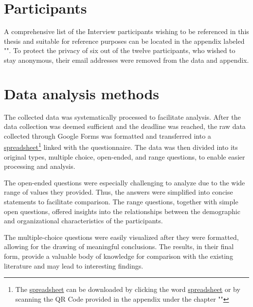 \section{Participants}\label{sec:Participants}
A comprehensive list of the Interview participants wishing to be referenced in this thesis and suitable for reference purposes can be located in the appendix labeled "". To protect the privacy of six out of the twelve participants, who wished to stay anonymous, their email addresses were removed from the data and appendix.

\section{Data analysis methods}\label{sec:Dataanalysismethods}
The collected data was systematically processed to facilitate analysis. After the data collection was deemed sufficient and the deadline was reached, the raw data collected through Google Forms was formatted and transferred into a \href{https://github.com/Inf166/mai-joel_maximilian-bachelor_thesis/raw/main/assets/data/data-formated-for-analysis.xlsx}{spreadsheet}\footnote{The \href{https://github.com/Inf166/mai-joel_maximilian-bachelor_thesis/raw/main/assets/data/data-formated-for-analysis.xlsx}{spreadsheet} can be downloaded by clicking the word \href{https://github.com/Inf166/mai-joel_maximilian-bachelor_thesis/raw/main/assets/data/data-formated-for-analysis.xlsx}{spreadsheet} or by scanning the QR Code provided in the appendix under the chapter ""} linked with the questionnaire. The data was then divided into its original types, multiple choice, open-ended, and range questions, to enable easier processing and analysis.

The open-ended questions were especially challenging to analyze due to the wide range of values they provided. Thus, the answers were simplified into concise statements to facilitate comparison. The range questions, together with simple open questions, offered insights into the relationships between the demographic and organizational characteristics of the participants.

The multiple-choice questions were easily visualized after they were formatted, allowing for the drawing of meaningful conclusions. The results, in their final form, provide a valuable body of knowledge for comparison with the existing literature and may lead to interesting findings.
